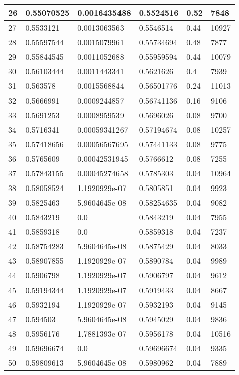 \begin{longtable}{|l|l|l|l|l|l|}
26 & 0.55070525 & 0.0016435488 & 0.5524516 & 0.52 & 7848 \\ \hline 
27 & 0.5533121 & 0.0013063563 & 0.5546514 & 0.44 & 10927 \\ \hline 
28 & 0.55597544 & 0.0015079961 & 0.55734694 & 0.48 & 7877 \\ \hline 
29 & 0.55844545 & 0.0011052688 & 0.55959594 & 0.44 & 10079 \\ \hline 
30 & 0.56103444 & 0.0011443341 & 0.5621626 & 0.4 & 7939 \\ \hline 
31 & 0.563578 & 0.0015568844 & 0.56501776 & 0.24 & 11013 \\ \hline 
32 & 0.5666991 & 0.0009244857 & 0.56741136 & 0.16 & 9106 \\ \hline 
33 & 0.5691253 & 0.0008959539 & 0.5696026 & 0.08 & 9700 \\ \hline 
34 & 0.5716341 & 0.00059341267 & 0.57194674 & 0.08 & 10257 \\ \hline 
35 & 0.57418656 & 0.00056567695 & 0.57441133 & 0.08 & 9775 \\ \hline 
36 & 0.5765609 & 0.00042531945 & 0.5766612 & 0.08 & 7255 \\ \hline 
37 & 0.57843155 & 0.00045274658 & 0.5785303 & 0.04 & 10964 \\ \hline 
38 & 0.58058524 & 1.1920929e-07 & 0.5805851 & 0.04 & 9923 \\ \hline 
39 & 0.5825463 & 5.9604645e-08 & 0.58254635 & 0.04 & 9082 \\ \hline 
40 & 0.5843219 & 0.0 & 0.5843219 & 0.04 & 7955 \\ \hline 
41 & 0.5859318 & 0.0 & 0.5859318 & 0.04 & 7237 \\ \hline 
42 & 0.58754283 & 5.9604645e-08 & 0.5875429 & 0.04 & 8033 \\ \hline 
43 & 0.58907855 & 1.1920929e-07 & 0.5890784 & 0.04 & 9989 \\ \hline 
44 & 0.5906798 & 1.1920929e-07 & 0.5906797 & 0.04 & 9612 \\ \hline 
45 & 0.59194344 & 1.1920929e-07 & 0.5919433 & 0.04 & 8667 \\ \hline 
46 & 0.5932194 & 1.1920929e-07 & 0.5932193 & 0.04 & 9145 \\ \hline 
47 & 0.594503 & 5.9604645e-08 & 0.5945029 & 0.04 & 9836 \\ \hline 
48 & 0.5956176 & 1.7881393e-07 & 0.5956178 & 0.04 & 10516 \\ \hline 
49 & 0.59696674 & 0.0 & 0.59696674 & 0.04 & 9335 \\ \hline 
50 & 0.59809613 & 5.9604645e-08 & 0.5980962 & 0.04 & 7889 \\ \hline 

\end{longtable}
